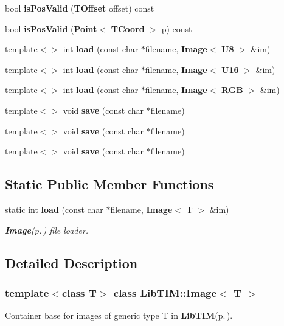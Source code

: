 \begin{CompactItemize}
\item 
bool {\bf is\-Pos\-Valid} ({\bf TOffset} offset) const 
\item 
bool {\bf is\-Pos\-Valid} ({\bf Point}$<$ {\bf TCoord} $>$ p) const 
\item 
template$<$$>$ int {\bf load} (const char $\ast$filename, {\bf Image}$<$ {\bf U8} $>$ \&im)
\item 
template$<$$>$ int {\bf load} (const char $\ast$filename, {\bf Image}$<$ {\bf U16} $>$ \&im)
\item 
template$<$$>$ int {\bf load} (const char $\ast$filename, {\bf Image}$<$ {\bf RGB} $>$ \&im)
\item 
template$<$$>$ void {\bf save} (const char $\ast$filename)
\item 
template$<$$>$ void {\bf save} (const char $\ast$filename)
\item 
template$<$$>$ void {\bf save} (const char $\ast$filename)
\end{CompactItemize}
\subsection*{Static Public Member Functions}
\begin{CompactItemize}
\item 
static int {\bf load} (const char $\ast$filename, {\bf Image}$<$ T $>$ \&im)
\begin{CompactList}\small\item\em {\bf Image}{\rm (p.\,\pageref{classLibTIM_1_1Image})} file loader. \item\end{CompactList}\end{CompactItemize}


\subsection{Detailed Description}
\subsubsection*{template$<$class T$>$ class Lib\-TIM::Image$<$ T $>$}

Container base for images of generic type T in {\bf Lib\-TIM}{\rm (p.\,\pageref{namespaceLibTIM})}. 

